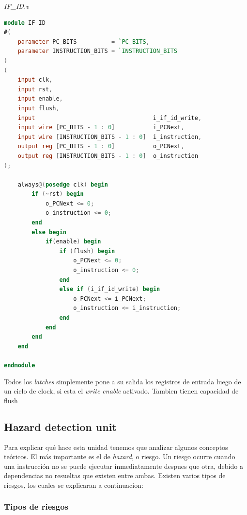 \documentclass[12pt]{article}
\begin{document}
\noindent \textit{IF\_ID.v}
\begin{lstlisting}[language=verilog]
module IF_ID
#(
    parameter PC_BITS          = `PC_BITS,
    parameter INSTRUCTION_BITS = `INSTRUCTION_BITS
)
(
    input clk,
    input rst,
    input enable,
    input flush,
    input                                  i_if_id_write,
    input wire [PC_BITS - 1 : 0]           i_PCNext,
    input wire [INSTRUCTION_BITS - 1 : 0]  i_instruction,
    output reg [PC_BITS - 1 : 0]           o_PCNext,
    output reg [INSTRUCTION_BITS - 1 : 0]  o_instruction
);

    always@(posedge clk) begin
        if (~rst) begin
            o_PCNext <= 0;
            o_instruction <= 0;
        end
        else begin
            if(enable) begin
                if (flush) begin
                    o_PCNext <= 0;
                    o_instruction <= 0;
                end
                else if (i_if_id_write) begin
                    o_PCNext <= i_PCNext;
                    o_instruction <= i_instruction;
                end
            end
        end
    end

endmodule

\end{lstlisting}

Todos los \textit{latches} simplemente pone a su salida los registros de entrada luego de un ciclo de clock, si esta el \textit{write enable} activado. Tambien tienen capacidad de flush

\subsection{Hazard detection unit}

Para explicar qué hace esta unidad tenemos que analizar algunos conceptos teóricos. El más importante es el de \textit{hazard}, o riesgo. Un riesgo ocurre cuando una instrucción no se puede ejecutar inmediatamente despues que otra, debido a dependencias no resueltas que existen entre ambas. Existen varios tipos de riesgos, los cuales se explicaran a continuacion:

\subsubsection{Tipos de riesgos}
\end{document}
